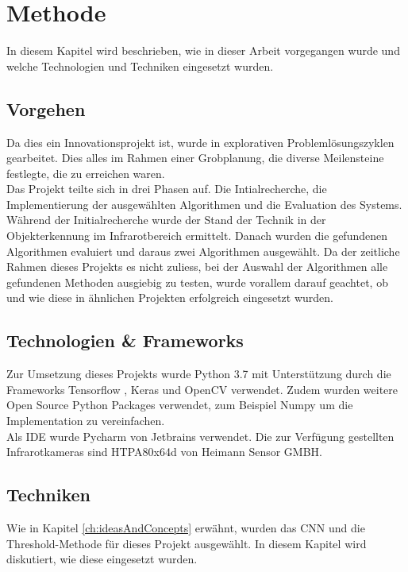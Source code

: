\chapter{Methode}

In diesem Kapitel wird beschrieben, wie in dieser Arbeit vorgegangen wurde und welche Technologien und Techniken eingesetzt wurden.


\section{Vorgehen}

Da dies ein Innovationsprojekt ist, wurde in explorativen Problemlösungszyklen gearbeitet. Dies alles im Rahmen einer Grobplanung, die diverse Meilensteine festlegte, die zu erreichen waren.\\
Das Projekt teilte sich in drei Phasen auf.  Die Intialrecherche, die Implementierung der ausgewählten Algorithmen und die Evaluation des Systems.\\
Während der Initialrecherche wurde der Stand der Technik in der Objekterkennung im Infrarotbereich ermittelt. Danach wurden die gefundenen Algorithmen evaluiert und daraus zwei Algorithmen ausgewählt. Da der zeitliche Rahmen dieses Projekts es nicht zuliess, bei der Auswahl der Algorithmen alle gefundenen Methoden ausgiebig zu testen, wurde vorallem darauf geachtet, ob und wie diese in ähnlichen Projekten erfolgreich eingesetzt wurden.

\section{Technologien \& Frameworks}
Zur Umsetzung dieses Projekts wurde Python 3.7 mit Unterstützung durch die Frameworks Tensorflow \parencite{tensorflow2015}, Keras \parencite{keras} und OpenCV \parencite{opencv} verwendet. Zudem wurden weitere Open Source Python Packages verwendet, zum Beispiel Numpy \parencite{numpy} um die Implementation zu vereinfachen.\\
Als \gls{IDE} wurde Pycharm von Jetbrains \parencite{pycharm} verwendet. Die zur Verfügung gestellten Infrarotkameras sind HTPA80x64d von Heimann Sensor GMBH.

\section{Techniken}

Wie in Kapitel \ref{ch:ideasAndConcepts} erwähnt, wurden das \gls{CNN} und die Threshold-Methode für dieses Projekt ausgewählt. In diesem Kapitel wird diskutiert, wie diese eingesetzt wurden.

